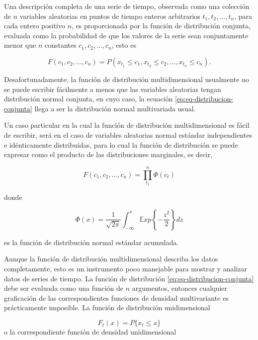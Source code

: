 \documentclass[12pt,]{krantz}
\theoremstyle{definition}
\theoremstyle{definition}
\theoremstyle{definition}
\theoremstyle{remark}
\begin{document}
Una descripción completa de una serie de tiempo, observada como una
colección de \(n\) variables aleatorias en puntos de tiempo enteros
arbitrarios \(t_1,t_2,\ldots,t_n\), para cada entero positivo \(n\), es
proporcionada por la función de distribución conjunta, evaluada como la
probabilidad de que los valores de la serie sean conjuntamente menor que
\(n\) constantes \(c_1,c_2,\ldots,c_n\), esto es

\begin{equation}
F(c_1,c_2,\ldots,c_n)=P(x_{t_1}\leq c_1,x_{t_2}\leq c_2,\ldots,x_{t_n}\leq c_n).
\label{eq:eq-distribucion-conjunta}
\end{equation}

Desafortunadamente, la función de distribución multidimensional
usualmente no se puede escribir fácilmente a menos que las variables
aleatorias tengan distribución normal conjunta, en cuyo caso, la
ecuación \eqref{eq:eq-distribucion-conjunta} llega a ser la distribución
normal multivariada usual.

Un caso particular en la cual la función de distribución
multidimensional es fácil de escribir, será en el caso de variables
aleatorias normal estándar independientes e idénticamente distribuidas,
para lo cual la función de distribución se puede expresar como el
producto de las distribuciones marginales, es decir,

\begin{equation}
F(c_1,c_2,\ldots,c_n)=\prod_{t_1}^{n}\Phi(c_t)
\label{eq:eq-distribucion-producto-marginal}
\end{equation}

donde

\begin{equation}
\Phi(x)=\frac{1}{\sqrt{2\pi}}\int_{-\infty}^{x}\mathbb{E}xp\left\{-\frac{z^2}{2}\right\}dz\label{eq:eq-distribucion-normal}
\end{equation}

es la función de distribución normal estándar acumulada.

Aunque la función de distribución multidimensional describa los datos
completamente, esto es un instrumento poco manejable para mostrar y
analizar datos de series de tiempo. La función de distribución
\eqref{eq:eq-distribucion-conjunta} debe ser evaluada como una función de
\(n\) argumentos, entonces cualquier graficación de las correspondientes
funciones de densidad multivariante es prácticamente imposible. La
función de distribución unidimensional

\[F_t(x)=P\{x_t\leq x\}\] o la correspondiente función de densidad
unidimensional
\end{document}
